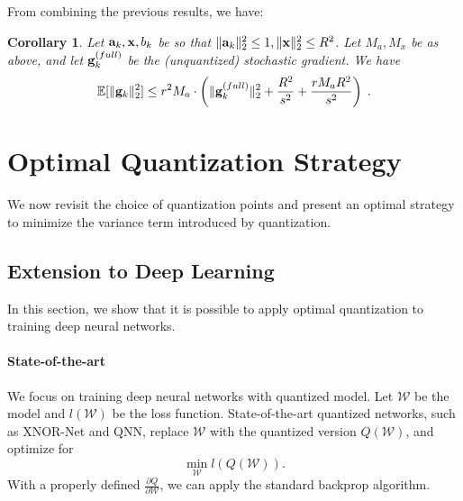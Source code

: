 \documentclass{article}
\def\a{{\bf a}}
\def\g{{\bf g}}
\def\x{{\bf x}}
\def\E{\mathbb{E}}
\newtheorem{corollary}{Corollary}
\begin{document}
%

\noindent From combining the previous results, we have:

\begin{corollary}
    \label{cor:full-quantization}
    Let $\a_k, \x, b_k$ be so that $\| \a_k \|_2^2 \leq 1, \| \x \|_2^2 \leq R^2$.
    Let $M_a, M_x$ be as above, and let $\g_k^{(full)}$ be the (unquantized) stochastic gradient.
    We have
    \[
    \E [\| \g_k \|_2^2] \leq r^2 M_a \cdot \left(  \| \g_k^{(full)} \|_2^2 + \frac{R^2}{s^2}   + \frac{r M_a R^2}{s^2} \right) \; .
    \]
\end{corollary}


\vspace{-2em}
\section{Optimal Quantization Strategy} \label{sec:optimal}

\vspace{-0.5em}
We now revisit the choice of quantization points
and present an optimal strategy to minimize 
the variance term introduced by quantization.



\vspace{-0.5em}
\subsection{Extension to Deep Learning}
\vspace{-0.5em}

In this section, we show that it is possible 
to apply optimal quantization to
training deep neural networks.

\paragraph*{State-of-the-art} We focus on
training deep neural networks with quantized
model. Let $\mathcal{W}$ be the model and 
$l(\mathcal{W})$ be the loss function. State-of-the-art quantized networks,
such as XNOR-Net and QNN, replace $\mathcal{W}$
with the quantized version $Q(\mathcal{W})$, and optimize
for
\[
\min_{\mathcal{W}} l(Q(\mathcal{W})).
\]
With a properly defined 
$\frac{\partial Q}{\partial{\mathcal{W}}}$, we can
apply the standard backprop 
algorithm.
\end{document}
